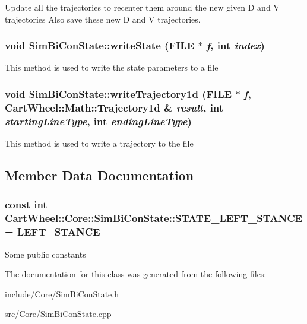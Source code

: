 \label{classCartWheel_1_1Core_1_1SimBiConState_ad49b8e2032a48c6bc1a9dba06d601ce5}
Update all the trajectories to recenter them around the new given D and V trajectories Also save these new D and V trajectories. \hypertarget{classCartWheel_1_1Core_1_1SimBiConState_ac1b1af166a6f804510ea63eb5d9cc036}{
\subsubsection[{writeState}]{\setlength{\rightskip}{0pt plus 5cm}void SimBiConState::writeState (FILE $\ast$ {\em f}, \/  int {\em index})}}
\label{classCartWheel_1_1Core_1_1SimBiConState_ac1b1af166a6f804510ea63eb5d9cc036}
This method is used to write the state parameters to a file \hypertarget{classCartWheel_1_1Core_1_1SimBiConState_a6425e0881ce0fd7bafddde8d4e2b6bc3}{
\subsubsection[{writeTrajectory1d}]{\setlength{\rightskip}{0pt plus 5cm}void SimBiConState::writeTrajectory1d (FILE $\ast$ {\em f}, \/  {\bf CartWheel::Math::Trajectory1d} \& {\em result}, \/  int {\em startingLineType}, \/  int {\em endingLineType})}}
\label{classCartWheel_1_1Core_1_1SimBiConState_a6425e0881ce0fd7bafddde8d4e2b6bc3}
This method is used to write a trajectory to the file 

\subsection{Member Data Documentation}
\hypertarget{classCartWheel_1_1Core_1_1SimBiConState_a3a418833302a944716944bb5fcab624f}{
\subsubsection[{STATE\_\-LEFT\_\-STANCE}]{\setlength{\rightskip}{0pt plus 5cm}const int {\bf CartWheel::Core::SimBiConState::STATE\_\-LEFT\_\-STANCE} = LEFT\_\-STANCE}}
\label{classCartWheel_1_1Core_1_1SimBiConState_a3a418833302a944716944bb5fcab624f}
Some public constants 

The documentation for this class was generated from the following files:\begin{DoxyCompactItemize}
\item 
include/Core/SimBiConState.h\item 
src/Core/SimBiConState.cpp\end{DoxyCompactItemize}
